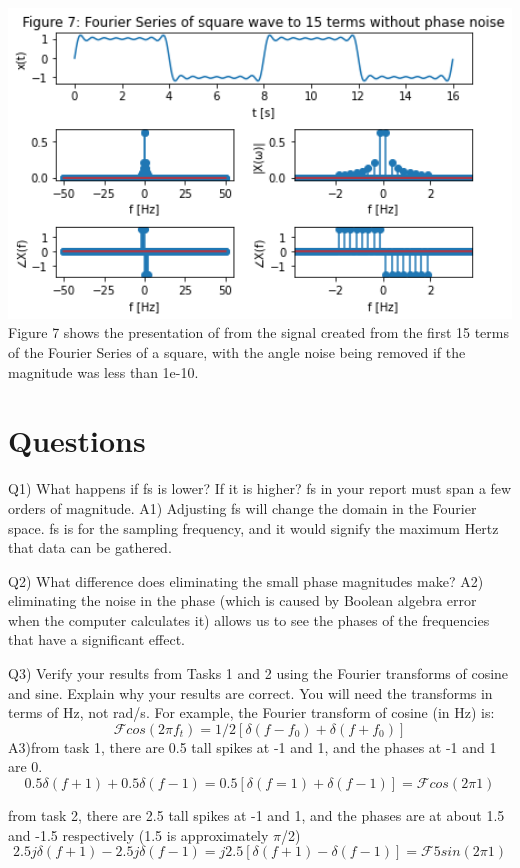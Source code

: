 \documentclass[12pt,a4paper]{article}
\begin{document}
\includegraphics[width=1\textwidth]{Figure7.png}\\
Figure 7 shows the presentation of from the signal created from the first 15 terms of the Fourier Series of a square, with the angle noise being removed if the magnitude was less than 1e-10.




\section{Questions}\label{sec:res}

Q1) What happens if fs is lower? If it is higher? fs in your report must span a few orders of magnitude.
A1) Adjusting fs will change the domain in the Fourier space.  fs is for the sampling frequency, and it would signify the maximum Hertz that data can be gathered.


Q2) What difference does eliminating the small phase magnitudes make?
A2) eliminating the noise in the phase (which is caused by Boolean algebra error when the computer calculates it) allows us to see the phases of the frequencies that have a significant effect.

Q3) Verify your results from Tasks 1 and 2 using the Fourier transforms of cosine and sine. Explain why your results are correct. You will need the transforms in terms of Hz, not rad/s. For example, the Fourier transform of cosine (in Hz) is:
\[\mathcal{F} {cos(2 \pi f_t)} = 1/2 [\delta(f-f_0)+\delta(f+f_0)]\]
A3)from task 1, there are 0.5 tall spikes at -1 and 1, and the phases at -1 and 1 are 0.
\[0.5 \delta(f+1)+ 0.5 \delta(f-1) = 0.5 [\delta(f=1)+\delta(f-1)] = \mathcal{F}{cos(2 \pi 1)}\]


from task 2, there are 2.5 tall spikes at -1 and 1, and the phases are at about 1.5 and -1.5 respectively (1.5 is approximately $\pi$/2)
\[2.5 j \delta(f+1) - 2.5 j \delta(f-1) = j2.5 [\delta(f+1)-\delta(f-1)] = \mathcal{F}{5sin(2 \pi 1)}\]
\end{document}
